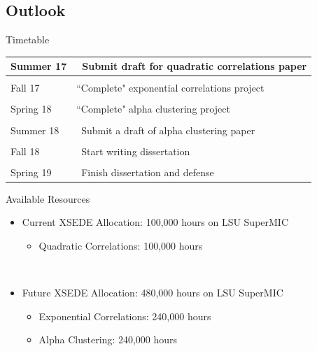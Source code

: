 \documentclass{beamer}
\begin{document}
\subsection{Outlook}
\begin{frame}{Timetable}
\begin{tabular}{p{2cm}|p{8cm}}
\\[-1.5ex]Summer 17 & ~Submit draft for quadratic correlations paper \\[1.5ex]
\hline \\[-1.5ex]
Fall 17 & ``Complete" exponential correlations project \\[1.5ex]
\hline \\[-1.5ex]
Spring 18 & ``Complete" alpha clustering project \\[1.5ex]
\hline \\[-1.5ex]
Summer 18 & ~Submit a draft of alpha clustering paper \\[1.5ex]
\hline \\[-1.5ex]
Fall 18 & ~Start writing dissertation \\[1.5ex]
\hline \\[-1.5ex]
Spring 19 & ~Finish dissertation and defense \\[1.5ex]
\end{tabular}
\end{frame}

\begin{frame}{Available Resources}
\begin{itemize}
   \item Current XSEDE Allocation: 100,000 hours on LSU SuperMIC
   \begin{itemize}
      \item Quadratic Correlations: 100,000 hours
   \end{itemize}
~
   \item Future XSEDE Allocation: 480,000 hours on LSU SuperMIC
   \begin{itemize}
      \item Exponential Correlations: 240,000 hours
      \item Alpha Clustering: 240,000 hours
   \end{itemize}
\end{itemize}
\end{frame}
\end{document}
